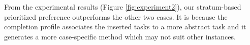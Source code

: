\documentclass[letterpaper]{article} %
\begin{document}
From the experimental results (Figure \ref{fig:experiment2}), our stratum-based prioritized preference outperforms the other two cases.
It is because the completion profile associates the inserted tasks to a more abstract task and it generates a more case-specific method which may not suit other instances.



\end{document}

